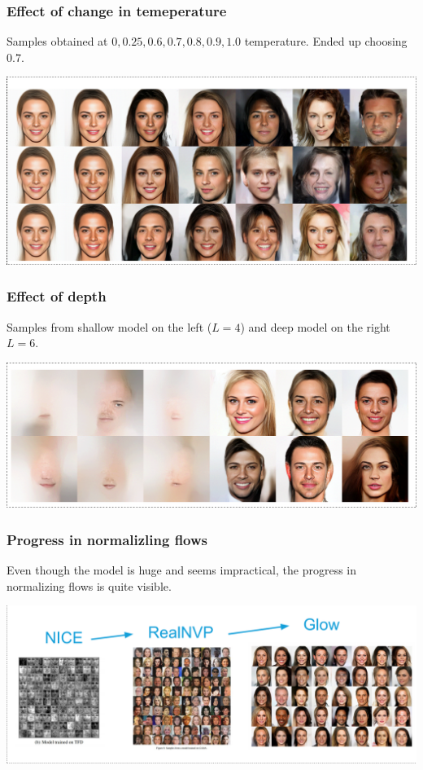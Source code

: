 \documentclass{beamer}
\begin{document}
\begin{frame}
  \frametitle{Effect of change in temeperature}

  Samples obtained at $0, 0.25, 0.6, 0.7, 0.8, 0.9, 1.0$ temperature. Ended up choosing $0.7$.

  \includegraphics[width=1.0\textwidth]{glow-temperature-increase.png}
\end{frame}

\begin{frame}
  \frametitle{Effect of depth}

  Samples from shallow model on the left ($L = 4$) and deep model on the right $L = 6$.

  \includegraphics[width=1.0\textwidth]{glow-depth.png}
\end{frame}

\begin{frame}
  \frametitle{Progress in normalizling flows}

  Even though the model is huge and seems impractical, the progress in
  normalizing flows is quite visible.

  \includegraphics[width=1.0\textwidth]{normalizing-flow-progress.png}
\end{frame}
\end{document}
